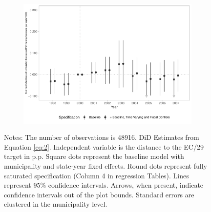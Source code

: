 \begin{figure}[h!]
\begin{center}
\begin{subfigure}{0.32\textwidth}
        \includegraphics[width=\textwidth]{plots/sia_ncnes_outpsf_pcapita_dist_ec29_baseline_dist_ec29_baseline_12.pdf}
    \end{subfigure}

    
    \end{center}
    
                \scriptsize{Notes: The number of observations is 48916. DiD Estimates from Equation \ref{eq:2}. Independent variable is the distance to the EC/29 target in p.p. Square dots represent the baseline model with municipality and state-year fixed effects. Round dots represent fully saturated specification (Column 4 in regression Tables). Lines represent 95\% confidence intervals. Arrows, when present, indicate confidence intervals out of the plot bounds. Standard errors are clustered in the municipality level.}
    
\end{figure}